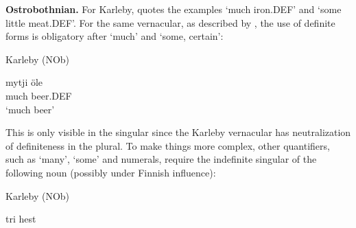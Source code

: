 
\textbf{Ostrobothnian.} For Karleby, \citet[94]{Hagfors1891} quotes the examples  ‘much iron.DEF’ and  ‘some little meat.DEF’. For the same vernacular, as described by \citet{Vangsnes2003}, the use of definite forms is obligatory after  ‘much’ and  ‘some, certain’:


\item 

Karleby (NOb)



 \ea\label{}
\gll mytji  öle\\


much  beer.DEF\\

\glt ‘much beer’

\z

This is only visible in the singular since the Karleby vernacular has neutralization of definiteness in the plural. To make things more complex, other quantifiers, such as  ‘many’,  ‘some’ and numerals, require the indefinite singular of the following noun (possibly under Finnish influence):


\item 

Karleby (NOb)



 \ea\label{}
\gll tri  hest\\


